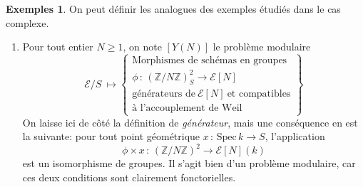 \documentclass[11pt,a4paper]{article}
\newcommand{\Z}{\mathbb{Z}}
\newcommand{\E}{\mathcal{E}}
\newcommand{\vers}{\longrightarrow}
\newcommand{\Spec}{\mathrm{Spec}\,}
\newcommand{\de}{\,:\,}
\theoremstyle{definition}
\newtheorem*{ex}{Exemples}
\begin{document}
\begin{ex} On peut définir les analogues des exemples étudiés dans le cas complexe.
\begin{enumerate}
\item Pour tout entier $N\geq 1$, on note $[Y(N)]$ le problème modulaire
$$ \E/S\ \longmapsto \left\{
\begin{matrix}
\text{Morphismes\ de\ schémas\ en\ groupes}\\
\phi\de (\Z/N\Z)^2_S\vers \E[N]\ \\
\text{générateurs\ de}\ \E[N]\ \text{et\ compatibles}\\
 \text{à\ l'accouplement\ de\ Weil}
\end{matrix}
\right\}$$
On laisse ici de côté la définition de \emph{générateur}, mais une conséquence en est la suivante: pour tout point géométrique $x\de\Spec k\vers S$, l'application
$$\phi \times x\de (\Z/N\Z)^2 \vers \E[N](k)$$
est un isomorphisme de groupes. Il s'agit bien d'un problème modulaire, car ces deux conditions sont clairement fonctorielles.


\end{enumerate}
\end{ex}
\end{document}
